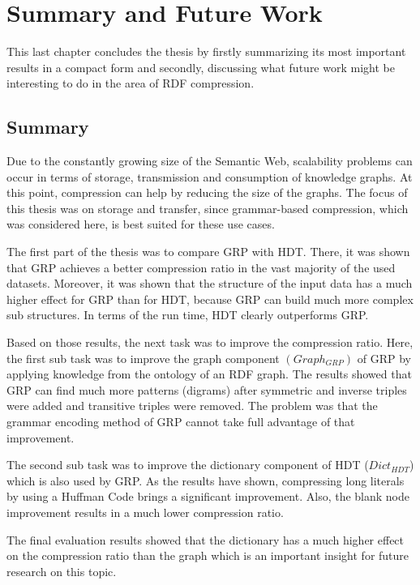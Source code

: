 \chapter{Summary and Future Work}\label{ch:summary_and_discussion}

This last chapter concludes the thesis by firstly summarizing its most important results in a compact form and secondly,  discussing what future work might be interesting to do in the area of RDF compression.

\section{Summary}

Due to the constantly growing size of the Semantic Web, scalability problems can occur in terms of storage, transmission and consumption of knowledge graphs. At this point, compression can help by reducing the size of the graphs. The focus of this thesis was on storage and transfer, since grammar-based compression, which was considered here, is best suited for these use cases. 

The first part of the thesis was to compare GRP with HDT. There, it was shown that GRP achieves a better compression ratio in the vast majority of the used datasets. Moreover, it was shown that the structure of the input data has a much higher effect for GRP than for HDT, because GRP can build much more complex sub structures. In terms of the run time, HDT clearly outperforms GRP.

Based on those results, the next task was to improve the compression ratio. Here, the first sub task was to improve the graph component $(Graph_{GRP})$ of GRP by applying knowledge from the ontology of an RDF graph. The results showed that GRP can find much more patterns (digrams) after symmetric and inverse triples were added and transitive triples were removed. The problem was that the grammar encoding method of GRP cannot take full advantage of that improvement.

The second sub task was to improve the dictionary component of HDT ($Dict_{HDT}$) which is also used by GRP. As the results have shown, compressing long literals by using a Huffman Code brings a significant improvement. Also, the blank node improvement results in a much lower compression ratio.

The final evaluation results showed that the dictionary has a much higher effect on the compression ratio than the graph which is an important insight for future research on this topic.


